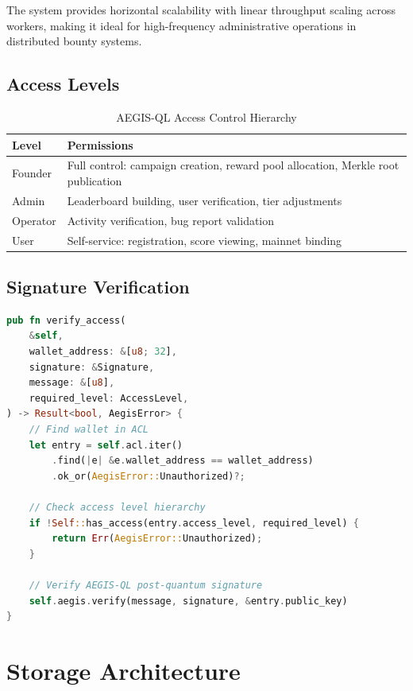 \documentclass[11pt,a4paper]{article}
\begin{document}
The system provides horizontal scalability with linear throughput scaling across workers, making it ideal for high-frequency administrative operations in distributed bounty systems.

\subsection{Access Levels}

\begin{table}[h]
\centering
\begin{tabular}{|l|p{8cm}|}
\hline
\textbf{Level} & \textbf{Permissions} \\ \hline
Founder        & Full control: campaign creation, reward pool allocation, Merkle root publication \\ \hline
Admin          & Leaderboard building, user verification, tier adjustments \\ \hline
Operator       & Activity verification, bug report validation \\ \hline
User           & Self-service: registration, score viewing, mainnet binding \\ \hline
\end{tabular}
\caption{AEGIS-QL Access Control Hierarchy}
\end{table}

\subsection{Signature Verification}

\begin{lstlisting}[language=rust]
pub fn verify_access(
    &self,
    wallet_address: &[u8; 32],
    signature: &Signature,
    message: &[u8],
    required_level: AccessLevel,
) -> Result<bool, AegisError> {
    // Find wallet in ACL
    let entry = self.acl.iter()
        .find(|e| &e.wallet_address == wallet_address)
        .ok_or(AegisError::Unauthorized)?;

    // Check access level hierarchy
    if !Self::has_access(entry.access_level, required_level) {
        return Err(AegisError::Unauthorized);
    }

    // Verify AEGIS-QL post-quantum signature
    self.aegis.verify(message, signature, &entry.public_key)
}
\end{lstlisting}

\section{Storage Architecture}
\end{document}
